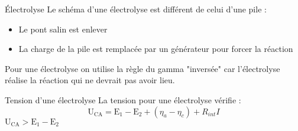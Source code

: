 \documentclass[french, a4paper, 11pt, twocolumn]{article}
\begin{document}
    \begin{cadre}{Électrolyse}
        Le schéma d'une électrolyse est différent de celui d'une pile :
            \begin{itemize}
                \item Le pont salin est enlever
                \item La charge de la pile est remplacée par un générateur pour forcer la réaction
            \end{itemize}

        \tcblower
        Pour une électrolyse on utilise la règle du gamma "inversée" car l'électrolyse réalise
        la réaction qui ne devrait pas avoir lieu.
    \end{cadre}

    \begin{cadre}{Tension d'une électrolyse}
        La tension pour une électrolyse vérifie :
            \[\mathrm{U_{CA}=E_1-E_2}+(\eta_a-\eta_c)+R_{int}I\]
        \tcblower
            \(\mathrm{U_{CA}>E_1-E_2}\)
    \end{cadre}
\end{document}
